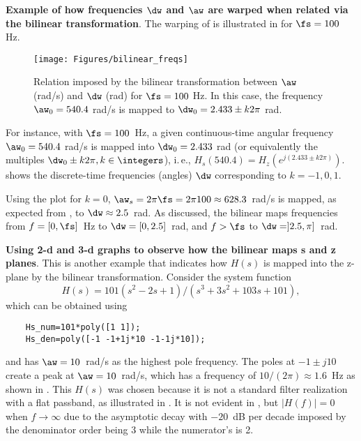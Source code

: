 \bExample \textbf{Example of how frequencies $\dw$ and $\aw$ are warped when related via the bilinear transformation}.
The warping of  is illustrated in  for $\fs = 100$ Hz. 

\begin{figure}
\centering
\texttt{[image: Figures/bilinear\_freqs]}
\caption{Relation imposed by the bilinear transformation between $\aw$ (rad/s) and $\dw$ (rad)  for $\fs = 100$ Hz. In this case, the frequency $\aw_0=540.4$ rad/s is mapped to $\dw_0=2.433 \pm k 2 \pi$ rad.\label{fig:bilinear_freqs}}
\end{figure}

For instance, with $\fs=100$~Hz, a given continuous-time angular frequency $\aw_0=540.4$ rad/s is mapped into $\dw_0=2.433$ rad (or equivalently the multiples $\dw_0 \pm k 2 \pi, k \in \integers$), i.\,e., $H_s(540.4) = H_z(e^{j(2.433 \pm k 2 \pi)})$.  shows the discrete-time frequencies (angles) $\dw$ corresponding to $k=-1,0,1$. 

Using the plot for $k=0$, $\aw_s=2 \pi \fs=2 \pi 100 \approx 628.3$~rad/s is mapped, as expected from , to $\dw \approx 2.5$~rad. As discussed, the bilinear maps frequencies from $f=[0, \fs]$~Hz to $\dw=[0, 2.5]$~rad, and $f>\fs$ to $\dw=]2.5, \pi]$~rad.
\eExample 

\bExample \textbf{Using 2-d and 3-d graphs to observe how the bilinear maps s and z planes}.
\label{ex:bilinearGraphs}
This is another example that indicates how $H(s)$ is mapped into the z-plane by the bilinear transformation. 
Consider the system function 
\begin{equation}
H(s)=101(s^2-2s+1)/(s^3+3s^2+103s+101),
\label{eq:hs_for_bilinear}
\end{equation}
which can be obtained using 
\begin{lstlisting}
    Hs_num=101*poly([1 1]);
    Hs_den=poly([-1 -1+1j*10 -1-1j*10]);
\end{lstlisting}
and has $\aw=10$~rad/s as the highest pole frequency. 
The poles at $-1 \pm j10$ create a peak at $\aw=10$~rad/s, which has a frequency of $10/(2\pi) \approx 1.6$~Hz as shown in . 
This $H(s)$ was chosen because it is not a standard filter realization with a flat passband,
as illustrated in . It is not evident in , but $|H(f)|=0$ when $f \rightarrow \infty$ due to the asymptotic decay with $-20$~dB per decade imposed by the denominator order being 3 while the numerator's is 2.

